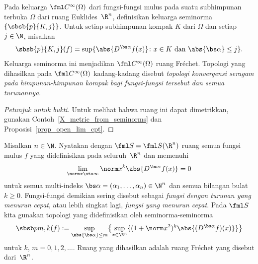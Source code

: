 \begin{exam}\label{X_smooth_fcns_Frechet} Pada keluarga $\fml C^\infty(\Omega)$ dari fungsi-fungsi mulus pada suatu subhimpunan terbuka $\Omega$ dari
ruang Euklides~$\R^n$, definisikan keluarga seminorma $\{\sbsb{p}{K,j}\}$. Untuk setiap subhimpunan kompak $K$ dari $\Omega$ dan setiap
$j \in \N$, misalkan
   \[ \sbsb{p}{K,j}(f) = \sup\{\abs{D^{\bs\alpha}f(x)}\colon x \in K \text{ dan } \abs{\bs\alpha} \le j\}. \]
Keluarga seminorma ini menjadikan $\fml C^\infty(\Omega)$ ruang Fr\'echet. Topologi yang dihasilkan pada $\fml C^\infty(\Omega)$
kadang-kadang disebut
\emph{topologi konvergensi seragam pada himpunan-himpunan kompak bagi fungsi-fungsi tersebut dan semua turunannya}.
\end{exam}

\begin{proof}[\emph{Petunjuk untuk bukti}] Untuk melihat bahwa ruang ini dapat dimetrikkan, gunakan Contoh~\ref{X_metric_from_seminorms} dan
Proposisi~\ref{prop_open_lim_cpt}.  \ns
\end{proof}

\begin{exam}\label{Schwartz_space} Misalkan $n \in \N$. Nyatakan dengan $\fml S = \fml S(\R^n)$
ruang semua fungsi mulus $f$ yang didefinisikan pada seluruh~$\R^n$ dan memenuhi
   \[ \lim_{\norm x \sto \infty}{\norm x}^k \abs{D^{\bs\alpha}f(x)} = 0 \]
untuk semua multi-indeks $\bs\alpha = (\alpha_1,\dots,\alpha_n) \in \N^n$ dan semua bilangan bulat $k \ge 0$. Fungsi-fungsi demikian sering disebut
sebagai
\emph{fungsi dengan turunan yang menurun cepat}, atau lebih singkat lagi, \emph{fungsi yang menurun cepat}. Pada $\fml S$ kita gunakan
topologi yang didefinisikan oleh seminorma-seminorma
   \[ \sbsb p{m,k}(f) := \sup_{\abs{\bs\alpha} \le m}\bigl\{\sup_{x \in \R^n} \{(1 + {\norm x}^2)^k \abs{(D^{\bs\alpha}f)(x)}\}\bigr\} \]
untuk $k$, $m = 0,1,2,\dots$. Ruang yang dihasilkan adalah ruang Fr\'echet yang disebut
 dari~$\R^n$.
\end{exam}

